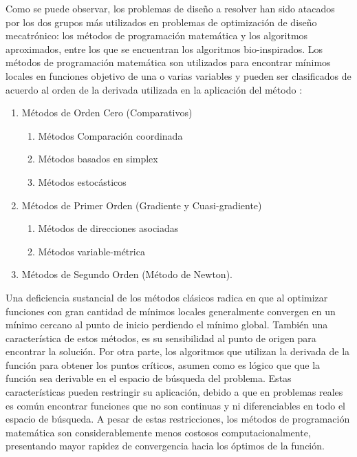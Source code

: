  Como se puede observar, los problemas de diseño a resolver han sido atacados por los dos grupos más utilizados en problemas de optimización de diseño mecatrónico: los métodos de programación matemática y los algoritmos aproximados, entre los que se encuentran los algoritmos bio-inspirados. Los métodos de programación matemática son utilizados para encontrar mínimos locales en funciones objetivo de una o varias variables y pueden ser clasificados de acuerdo al orden de la derivada utilizada en la aplicación del método \cite{bishop_mechatronics_2002}:
  \begin{enumerate}
  	\item Métodos de Orden Cero (Comparativos)
  	\begin{enumerate}
  		\item Métodos Comparación coordinada
  		\item Métodos basados en simplex
  		\item Métodos estocásticos  
  	\end{enumerate}
  	\item Métodos de Primer Orden (Gradiente y Cuasi-gradiente)
  	\begin{enumerate}
  		\item Métodos de direcciones asociadas
  		\item Métodos variable-métrica 
  	\end{enumerate}
  	\item Métodos de Segundo Orden (Método de Newton).
  \end{enumerate}
  Una deficiencia sustancial de los métodos clásicos radica en que al optimizar funciones con gran cantidad de mínimos locales generalmente convergen en un mínimo cercano al punto de inicio perdiendo el mínimo global. También una característica de estos métodos, es su sensibilidad al punto de origen para encontrar la solución. Por otra parte, los algoritmos que utilizan la derivada de la función para obtener los puntos críticos, asumen como es lógico que que la función sea derivable en el espacio de búsqueda del problema. Estas características pueden restringir su aplicación, debido a que en problemas reales es común encontrar funciones que no son continuas y ni diferenciables en todo el espacio de búsqueda. A pesar de estas restricciones, los métodos de programación matemática son considerablemente menos costosos computacionalmente, presentando mayor rapidez de convergencia hacia los óptimos de la función.\\   
